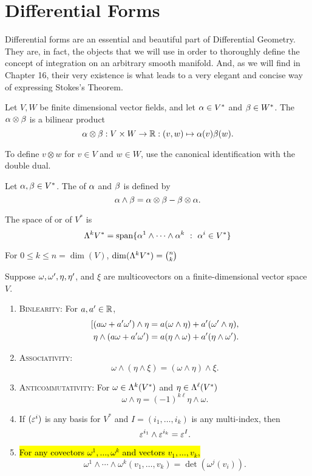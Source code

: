 \newpage\setcounter{section}{13}
\section{Differential Forms}

Differential forms are an essential and beautiful part of Differential Geometry. They are, in fact, the objects that we will use in order to thoroughly define the concept of integration on an arbitrary smooth manifold. And, as we will find in Chapter 16, their very existence is what leads to a very elegant and concise way of expressing Stokes's Theorem.

\dfn Let $V, W$ be finite dimensional vector fields, and let $\alpha\in V^*$ and $\beta \in W^*$. The  $\alpha\otimes\beta$ is a bilinear product
\[\alpha\otimes\beta:V\times W\rightarrow \mathbb{R}:(v,w)\mapsto \alpha(v)\beta(w).\]

\nb To define $v\otimes w$ for $v\in V$ and $w\in W$, use the canonical identification with the double dual.

\dfn Let $\alpha,\beta\in V^*$. The  of $\alpha$ and $\beta$ is defined by
\[\alpha\wedge\beta = \alpha\otimes \beta - \beta\otimes \alpha.\]

\dfn The space of  or  of $V^*$ is
\[\Lambda^kV^* = \text{span}\{\alpha^1\wedge\cdots\wedge\alpha^k\ :\ \alpha^i\in V^*\}\]

\nb For $0\leq k \leq n = \dim(V)$, $\dim(\Lambda^kV^*) = {n \choose k}$

\setcounter{thm}{10}

\begin{prop} Suppose $\omega,\omega^\prime,\eta,\eta^\prime$, and $\xi$ are multicovectors on a finite-dimensional vector space $V$.
\begin{enumerate}
    \item {\scshape Binlearity:} For $a,a^\prime\in \mathbb{R}$,
    \begin{align*}
        [(a\omega + a^\prime\omega^\prime)\wedge\eta = a(\omega\wedge\eta) + a^\prime(\omega^\prime\wedge\eta),\\
        \eta\wedge(a\omega + a^\prime\omega^\prime) = a(\eta\wedge\omega) + a^\prime(\eta\wedge\omega^\prime).
    \end{align*}
    \item {\scshape Associativity:}
        \[\omega\wedge(\eta\wedge\xi) = (\omega\wedge\eta)\wedge\xi.\]
    \item {\scshape Anticommutativity:} For $\omega\in\Lambda^k(V^*)$ and $\eta\in\Lambda^\ell(V^*)$
    \[\omega\wedge\eta = (-1)^{k\ell}\eta\wedge\omega.\]
    \item If $(\varepsilon^i)$ is any basis for $V^*$ and $I = (i_1,\ldots,i_k)$ is any multi-index, then
    \[\varepsilon^{i_1}\wedge\varepsilon^{i_k} = \varepsilon^I.\]
    \item \hl{For any covectors $\omega^1,\ldots,\omega^k$ and vectors $v_1,\ldots,v_k$,}
    \[\omega^1\wedge\cdots\wedge\omega^k(v_1,\ldots,v_k) = \det(\omega^j(v_i)).\]
\end{enumerate}
\end{prop}


